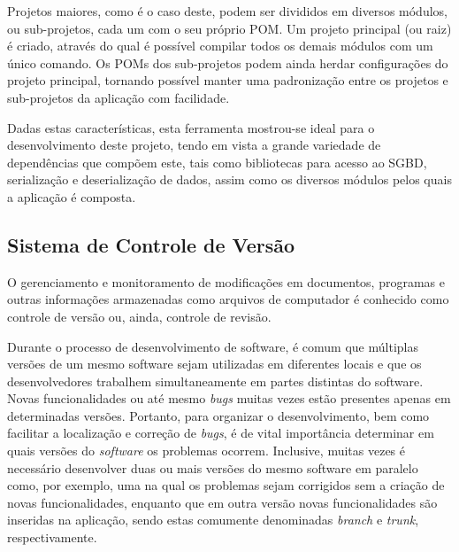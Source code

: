 Projetos maiores, como é o caso deste, podem ser divididos em diversos módulos, ou sub-projetos, cada um com o seu próprio POM.
Um projeto principal (ou raiz) é criado, através do qual é possível compilar todos os demais módulos com um único comando.
Os POMs dos sub-projetos podem ainda herdar configurações do projeto principal, tornando possível manter uma padronização entre os projetos e sub-projetos da aplicação com facilidade.

Dadas estas características, esta ferramenta mostrou-se ideal para o desenvolvimento deste projeto, tendo em vista a grande variedade de dependências que compõem este, tais como bibliotecas para acesso ao SGBD, serialização e deserialização de dados, assim como os diversos módulos pelos quais a aplicação é composta.


\subsection{Sistema de Controle de Versão}\label{met:git}


O gerenciamento e monitoramento de modificações em documentos, programas e outras informações armazenadas como arquivos de computador é conhecido como controle de versão ou, ainda, controle de revisão.

Durante o processo de desenvolvimento de software, é comum que múltiplas versões de um mesmo software sejam utilizadas em diferentes locais e que os desenvolvedores trabalhem simultaneamente em partes distintas do software.
Novas funcionalidades ou até mesmo \emph{bugs} muitas vezes estão presentes apenas em determinadas versões.
Portanto, para organizar o desenvolvimento, bem como facilitar a localização e correção de \emph{bugs}, é de vital importância determinar em quais versões do \emph{software} os problemas ocorrem.
Inclusive, muitas vezes é necessário desenvolver duas ou mais versões do mesmo software em paralelo como, por exemplo, uma na qual os problemas sejam corrigidos sem a criação de novas funcionalidades, enquanto que em outra versão novas funcionalidades são inseridas na aplicação, sendo estas comumente denominadas \emph{branch} e \emph{trunk}, respectivamente.

